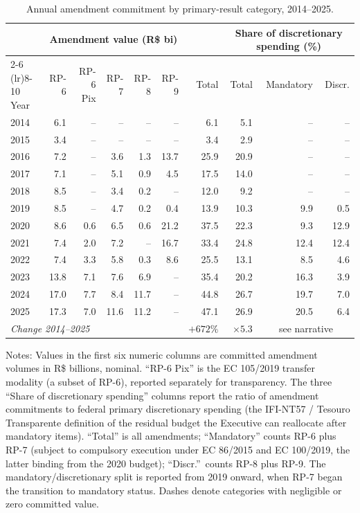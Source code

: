 \documentclass[pdflatex,sn-basic]{sn-jnl}
\begin{document}
\begin{table}[htbp]
\centering
\caption{Annual amendment commitment by primary-result category, 2014--2025.}
\label{tab:stylized}
\small
\setlength{\tabcolsep}{4pt}
\begin{tabular}{lrrrrrrrrr}
\toprule
& \multicolumn{5}{c}{Amendment value (R\$ bi)} & & \multicolumn{3}{c}{Share of discretionary spending (\%)} \\
\cmidrule(lr){2-6} \cmidrule(lr){8-10}
Year & RP-6 & RP-6 Pix & RP-7 & RP-8 & RP-9 & Total & Total & Mandatory & Discr.\\
\midrule
2014 & 6.1  & --    & --    & --    & --    & 6.1  & 5.1  & --   & --   \\
2015 & 3.4  & --    & --    & --    & --    & 3.4  & 2.9  & --   & --   \\
2016 & 7.2  & --    & 3.6   & 1.3   & 13.7  & 25.9 & 20.9 & --   & --   \\
2017 & 7.1  & --    & 5.1   & 0.9   & 4.5   & 17.5 & 14.0 & --   & --   \\
2018 & 8.5  & --    & 3.4   & 0.2   & --    & 12.0 & 9.2  & --   & --   \\
2019 & 8.5  & --    & 4.7   & 0.2   & 0.4   & 13.9 & 10.3 & 9.9  & 0.5  \\
2020 & 8.6  & 0.6   & 6.5   & 0.6   & 21.2  & 37.5 & 22.3 & 9.3  & 12.9 \\
2021 & 7.4  & 2.0   & 7.2   & --    & 16.7  & 33.4 & 24.8 & 12.4 & 12.4 \\
2022 & 7.4  & 3.3   & 5.8   & 0.3   & 8.6   & 25.5 & 13.1 & 8.5  & 4.6  \\
2023 & 13.8 & 7.1   & 7.6   & 6.9   & --    & 35.4 & 20.2 & 16.3 & 3.9  \\
2024 & 17.0 & 7.7   & 8.4   & 11.7  & --    & 44.8 & 26.7 & 19.7 & 7.0  \\
2025 & 17.3 & 7.0   & 11.6  & 11.2  & --    & 47.1 & 26.9 & 20.5 & 6.4  \\
\midrule
\multicolumn{6}{l}{\emph{Change 2014--2025}} & $+672\%$ & $\times 5.3$ & \multicolumn{2}{c}{see narrative} \\
\bottomrule
\end{tabular}
\begin{tablenotes}
\small
\item Notes: Values in the first six numeric columns are committed amendment volumes in R\$ billions, nominal. ``RP-6 Pix'' is the EC 105/2019 transfer modality (a subset of RP-6), reported separately for transparency. The three ``Share of discretionary spending'' columns report the ratio of amendment commitments to federal primary discretionary spending (the IFI-NT57 / Tesouro Transparente definition of the residual budget the Executive can reallocate after mandatory items). ``Total'' is all amendments; ``Mandatory'' counts RP-6 plus RP-7 (subject to compulsory execution under EC 86/2015 and EC 100/2019, the latter binding from the 2020 budget); ``Discr.''\ counts RP-8 plus RP-9. The mandatory/discretionary split is reported from 2019 onward, when RP-7 began the transition to mandatory status. Dashes denote categories with negligible or zero committed value.
\end{tablenotes}
\end{table}
\end{document}
